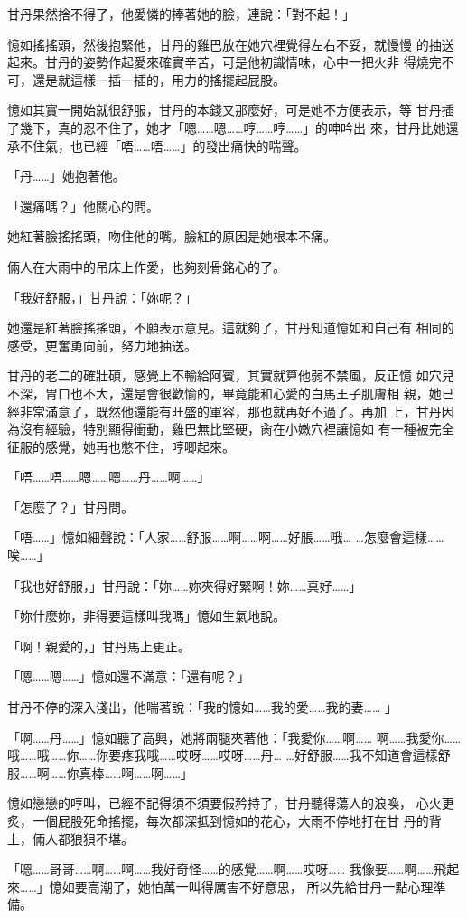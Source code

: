 甘丹果然捨不得了，他愛憐的捧著她的臉，連說：「對不起！」

憶如搖搖頭，然後抱緊他，甘丹的雞巴放在她穴裡覺得左右不妥，就慢慢
的抽送起來。甘丹的姿勢作起愛來確實辛苦，可是他初識情味，心中一把火非
得燒完不可，還是就這樣一插一插的，用力的搖擺起屁股。

憶如其實一開始就很舒服，甘丹的本錢又那麼好，可是她不方便表示，等
甘丹插了幾下，真的忍不住了，她才「嗯……嗯……哼……哼……」的呻吟出
來，甘丹比她還承不住氣，也已經「唔……唔……」的發出痛快的喘聲。

「丹……」她抱著他。

「還痛嗎？」他關心的問。

她紅著臉搖搖頭，吻住他的嘴。臉紅的原因是她根本不痛。

倆人在大雨中的吊床上作愛，也夠刻骨銘心的了。

「我好舒服，」甘丹說：「妳呢？」

她還是紅著臉搖搖頭，不願表示意見。這就夠了，甘丹知道憶如和自己有
相同的感受，更奮勇向前，努力地抽送。

甘丹的老二的確壯碩，感覺上不輸給阿賓，其實就算他弱不禁風，反正憶
如穴兒不深，胃口也不大，還是會很歡愉的，畢竟能和心愛的白馬王子肌膚相
親，她已經非常滿意了，既然他還能有旺盛的軍容，那也就再好不過了。再加
上，甘丹因為沒有經驗，特別顯得衝動，雞巴無比堅硬，肏在小嫩穴裡讓憶如
有一種被完全征服的感覺，她再也憋不住，哼唧起來。

「唔……唔……嗯……嗯……丹……啊……」

「怎麼了？」甘丹問。

「唔……」憶如細聲說：「人家……舒服……啊……啊……好脹……哦…
…怎麼會這樣……唉……」

「我也好舒服，」甘丹說：「妳……妳夾得好緊啊！妳……真好……」

「妳什麼妳，非得要這樣叫我嗎」憶如生氣地說。

「啊！親愛的，」甘丹馬上更正。

「嗯……嗯……」憶如還不滿意：「還有呢？」

甘丹不停的深入淺出，他喘著說：「我的憶如……我的愛……我的妻……
」

「啊……丹……」憶如聽了高興，她將兩腿夾著他：「我愛你……啊……
啊……我愛你……哦……哦……你……你要疼我哦……哎呀……哎呀……丹…
…好舒服……我不知道會這樣舒服……啊……你真棒……啊……啊……」

憶如戀戀的哼叫，已經不記得須不須要假矜持了，甘丹聽得蕩人的浪喚，
心火更炙，一個屁股死命搖擺，每次都深抵到憶如的花心，大雨不停地打在甘
丹的背上，倆人都狼狽不堪。

「嗯……哥哥……啊……啊……我好奇怪……的感覺……啊……哎呀……
我像要……啊……飛起來……」憶如要高潮了，她怕萬一叫得厲害不好意思，
所以先給甘丹一點心理準備。

